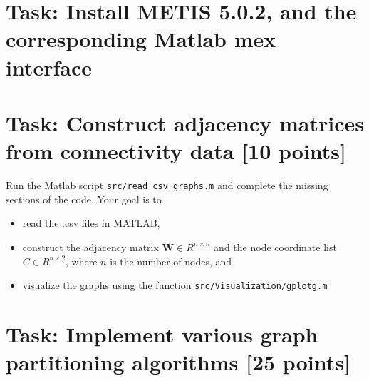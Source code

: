 \documentclass[unicode,11pt,a4paper,oneside,numbers=endperiod,openany]{scrartcl}
\begin{document}
\setassignment
{}

\newline

\assignmentpolicy

\section{Task: Install METIS 5.0.2, and the corresponding Matlab mex interface}


\section{Task:  Construct adjacency matrices
from connectivity data [10 points]}


Run the Matlab script
\texttt{src/read\_csv\_graphs.m} and complete
the
missing sections of the code. Your goal is to
\begin{itemize}
    \item read the .csv files in MATLAB,
    \item construct the adjacency matrix
    $\mathbf{W} \in R^{n\times n}$ and
    the node coordinate list $C \in
    R^{n\times 2}$, where $n$ is the number of nodes, and 
    \item visualize the graphs using the
    function
    \texttt{src/Visualization/gplotg.m}
\end{itemize}


\section{Task: Implement various graph partitioning algorithms [25 points]}
\end{document}
